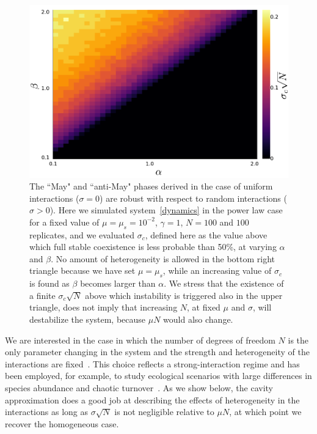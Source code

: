 \documentclass[
 prl,
 twocolumn,
 amsmath,
 amssymb,
 aps,
]{revtex4-2}
\begin{document}
\begin{figure}[t!]
    \includegraphics[width=.45\textwidth]{alpha-beta.pdf}
    \caption{The ``May" and ``anti-May" phases derived in the
    case of uniform interactions ($\sigma = 0$) are robust with respect to random interactions ($\sigma > 0$).
    Here we simulated system~\eqref{dynamics} in the power law case for a fixed value of
    $\mu=\mu_s=10^{-2}$, $\gamma=1$, $N=100$ and $100$ replicates,  
    and we evaluated $\sigma_c$, defined here as
    the value above which full stable coexistence is less probable than 50\%,
    at varying $\alpha$ and $\beta$.
    No amount of heterogeneity is allowed in the bottom right triangle because we have set $\mu=\mu_s$, while an increasing value of $\sigma_c$
    is found as $\beta$ becomes larger than $\alpha$.
    We stress that the existence of a finite $\sigma_c\sqrt{N}$ above which instability is triggered also in the upper triangle,
    does not imply that increasing $N$, at fixed $\mu$ and $\sigma$, will destabilize the system, because $\mu N$ would also change.
    }
    \label{fig: alpha-beta}
\end{figure}
We are interested in the case in which the number of degrees of freedom $N$ is the only parameter changing in the system and the strength and heterogeneity of the interactions are fixed~\cite{kessler2015generalized,fried2016communities}. This choice reflects a strong-interaction regime and has been employed, for example, to study ecological scenarios with large differences in species abundance and chaotic turnover~\cite{mallmin2024chaotic}. As we show below, the cavity approximation does a good job at describing the effects of heterogeneity in the interactions as long as $\sigma \sqrt{N}$ is not negligible relative to $\mu N$, at which point we recover the homogeneous case.
\end{document}
